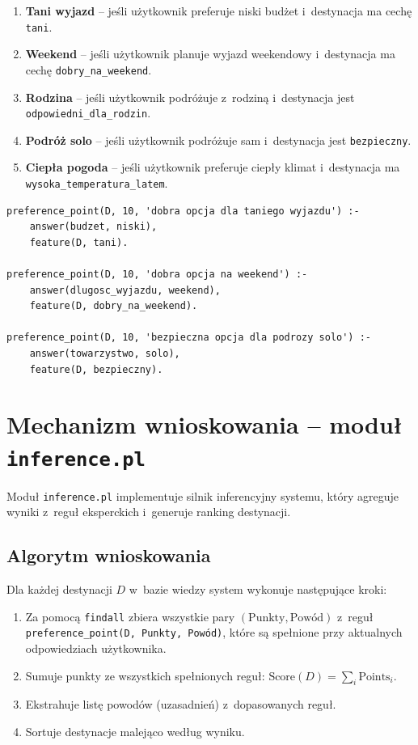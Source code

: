 \documentclass[12pt,a4paper]{article}
\begin{document}
\begin{enumerate}
    \item \textbf{Tani wyjazd} -- jeśli użytkownik preferuje niski budżet i~destynacja ma cechę \texttt{tani}.
    \item \textbf{Weekend} -- jeśli użytkownik planuje wyjazd weekendowy i~destynacja ma cechę \texttt{dobry\_na\_weekend}.
    \item \textbf{Rodzina} -- jeśli użytkownik podróżuje z~rodziną i~destynacja jest \texttt{odpowiedni\_dla\_rodzin}.
    \item \textbf{Podróż solo} -- jeśli użytkownik podróżuje sam i~destynacja jest \texttt{bezpieczny}.
    \item \textbf{Ciepła pogoda} -- jeśli użytkownik preferuje ciepły klimat i~destynacja ma \texttt{wysoka\_temperatura\_latem}.
\end{enumerate}

\begin{lstlisting}[style=prolog, caption={Przykłady reguł specjalistycznych}]
preference_point(D, 10, 'dobra opcja dla taniego wyjazdu') :-
    answer(budzet, niski),
    feature(D, tani).

preference_point(D, 10, 'dobra opcja na weekend') :-
    answer(dlugosc_wyjazdu, weekend),
    feature(D, dobry_na_weekend).

preference_point(D, 10, 'bezpieczna opcja dla podrozy solo') :-
    answer(towarzystwo, solo),
    feature(D, bezpieczny).
\end{lstlisting}

\section{Mechanizm wnioskowania -- moduł \texttt{inference.pl}}

Moduł \texttt{inference.pl} implementuje silnik inferencyjny systemu, który agreguje wyniki z~reguł eksperckich i~generuje ranking destynacji.

\subsection{Algorytm wnioskowania}

Dla każdej destynacji $D$ w~bazie wiedzy system wykonuje następujące kroki:

\begin{enumerate}
    \item Za pomocą \texttt{findall} zbiera wszystkie pary $(\text{Punkty}, \text{Powód})$ z~reguł \texttt{preference\_point(D, Punkty, Powód)}, które są spełnione przy aktualnych odpowiedziach użytkownika.
    \item Sumuje punkty ze wszystkich spełnionych reguł: $\text{Score}(D) = \sum_{i} \text{Points}_i$.
    \item Ekstrahuje listę powodów (uzasadnień) z~dopasowanych reguł.
    \item Sortuje destynacje malejąco według wyniku.
\end{enumerate}
\end{document}
